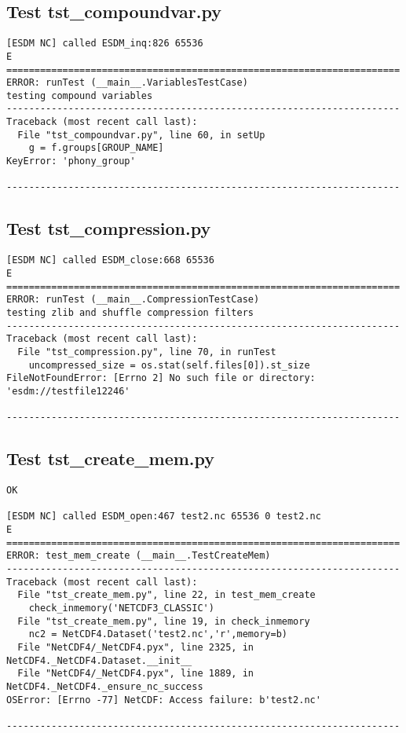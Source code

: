 \subsection{Test tst\_compoundvar.py}

\begin{verbatim}
[ESDM NC] called ESDM_inq:826 65536
E
======================================================================
ERROR: runTest (__main__.VariablesTestCase)
testing compound variables
----------------------------------------------------------------------
Traceback (most recent call last):
  File "tst_compoundvar.py", line 60, in setUp
    g = f.groups[GROUP_NAME]
KeyError: 'phony_group'

----------------------------------------------------------------------
\end{verbatim}

\subsection{Test tst\_compression.py}

\begin{verbatim}
[ESDM NC] called ESDM_close:668 65536
E
======================================================================
ERROR: runTest (__main__.CompressionTestCase)
testing zlib and shuffle compression filters
----------------------------------------------------------------------
Traceback (most recent call last):
  File "tst_compression.py", line 70, in runTest
    uncompressed_size = os.stat(self.files[0]).st_size
FileNotFoundError: [Errno 2] No such file or directory: 'esdm://testfile12246'

----------------------------------------------------------------------
\end{verbatim}

\subsection{Test tst\_create\_mem.py}

\begin{verbatim}
OK

[ESDM NC] called ESDM_open:467 test2.nc 65536 0 test2.nc
E
======================================================================
ERROR: test_mem_create (__main__.TestCreateMem)
----------------------------------------------------------------------
Traceback (most recent call last):
  File "tst_create_mem.py", line 22, in test_mem_create
    check_inmemory('NETCDF3_CLASSIC')
  File "tst_create_mem.py", line 19, in check_inmemory
    nc2 = NetCDF4.Dataset('test2.nc','r',memory=b)
  File "NetCDF4/_NetCDF4.pyx", line 2325, in NetCDF4._NetCDF4.Dataset.__init__
  File "NetCDF4/_NetCDF4.pyx", line 1889, in NetCDF4._NetCDF4._ensure_nc_success
OSError: [Errno -77] NetCDF: Access failure: b'test2.nc'

----------------------------------------------------------------------
\end{verbatim}

